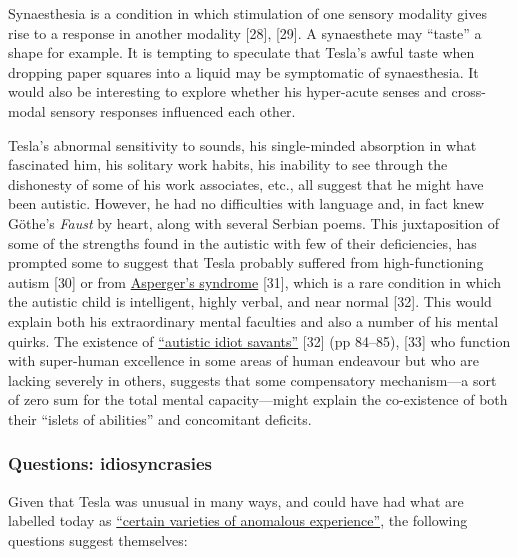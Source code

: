 \documentclass[
  11pt,
  a4paper,
]{article}
\begin{document}
Synaesthesia is a condition in which stimulation of one sensory modality
gives rise to a response in another modality {[}28{]}, {[}29{]}. A
synaesthete may ``taste'' a shape for example. It is tempting to
speculate that Tesla's awful taste when dropping paper squares into a
liquid may be symptomatic of synaesthesia. It would also be interesting
to explore whether his hyper-acute senses and cross-modal sensory
responses influenced each other.

Tesla's abnormal sensitivity to sounds, his single-minded absorption in
what fascinated him, his solitary work habits, his inability to see
through the dishonesty of some of his work associates, etc., all suggest
that he might have been autistic. However, he had no difficulties with
language and, in fact knew Göthe's \emph{Faust} by heart, along with
several Serbian poems. This juxtaposition of some of the strengths found
in the autistic with few of their deficiencies, has prompted some to
suggest that Tesla probably suffered from high-functioning autism
{[}30{]} or from
\href{https://en.wikipedia.org/wiki/Asperger_syndrome}{Asperger's
syndrome} {[}31{]}, which is a rare condition in which the autistic
child is intelligent, highly verbal, and near normal {[}32{]}. This
would explain both his extraordinary mental faculties and also a number
of his mental quirks. The existence of
\href{https://en.wikipedia.org/wiki/Savant_syndrome}{``autistic idiot
savants''} {[}32{]} (pp 84--85), {[}33{]} who function with super-human
excellence in some areas of human endeavour but who are lacking severely
in others, suggests that some compensatory mechanism---a sort of zero
sum for the total mental capacity---might explain the co-existence of
both their ``islets of abilities'' and concomitant deficits.

\hypertarget{questions-idiosyncrasies}{%
\subsubsection{Questions:
idiosyncrasies}\label{questions-idiosyncrasies}}

Given that Tesla was unusual in many ways, and could have had what are
labelled today as
\href{https://en.wikipedia.org/wiki/Varieties_of_Anomalous_Experience}{``certain
varieties of anomalous experience''}, the following questions suggest
themselves:
\end{document}
